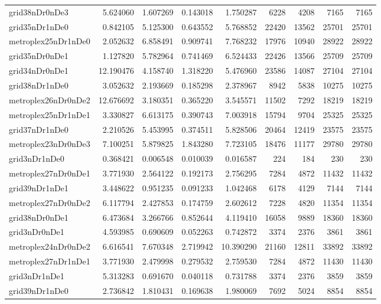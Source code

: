 \begin{longtable}{|l|r|r|r|r|r|r|r|r|}
grid38nDr0nDe3 & 5.624060 & 1.607269 & 0.143018 & 1.750287 & 6228 & 4208 & 7165 & 7165 \\
grid35nDr1nDe0 & 0.842105 & 5.125300 & 0.643552 & 5.768852 & 22420 & 13562 & 25701 & 25701 \\
metroplex25nDr1nDe0 & 2.052632 & 6.858491 & 0.909741 & 7.768232 & 17976 & 10940 & 28922 & 28922 \\
grid35nDr0nDe1 & 1.127820 & 5.782964 & 0.741469 & 6.524433 & 22426 & 13566 & 25709 & 25709 \\
grid34nDr0nDe1 & 12.190476 & 4.158740 & 1.318220 & 5.476960 & 23586 & 14087 & 27104 & 27104 \\
grid38nDr1nDe0 & 3.052632 & 2.193669 & 0.185298 & 2.378967 & 8942 & 5838 & 10275 & 10275 \\
metroplex26nDr0nDe2 & 12.676692 & 3.180351 & 0.365220 & 3.545571 & 11502 & 7292 & 18219 & 18219 \\
metroplex25nDr1nDe1 & 3.330827 & 6.613175 & 0.390743 & 7.003918 & 15794 & 9704 & 25325 & 25325 \\
grid37nDr1nDe0 & 2.210526 & 5.453995 & 0.374511 & 5.828506 & 20464 & 12419 & 23575 & 23575 \\
metroplex23nDr0nDe3 & 7.100251 & 5.879825 & 1.843280 & 7.723105 & 18476 & 11177 & 29780 & 29780 \\
grid3nDr1nDe0 & 0.368421 & 0.006548 & 0.010039 & 0.016587 & 224 & 184 & 230 & 230 \\
metroplex27nDr0nDe1 & 3.771930 & 2.564122 & 0.192173 & 2.756295 & 7284 & 4872 & 11432 & 11432 \\
grid39nDr1nDe1 & 3.448622 & 0.951235 & 0.091233 & 1.042468 & 6178 & 4129 & 7144 & 7144 \\
metroplex27nDr0nDe2 & 6.117794 & 2.427853 & 0.174759 & 2.602612 & 7228 & 4820 & 11354 & 11354 \\
grid38nDr0nDe1 & 6.473684 & 3.266766 & 0.852644 & 4.119410 & 16058 & 9889 & 18360 & 18360 \\
grid3nDr0nDe1 & 4.593985 & 0.690609 & 0.052263 & 0.742872 & 3374 & 2376 & 3861 & 3861 \\
metroplex24nDr0nDe2 & 6.616541 & 7.670348 & 2.719942 & 10.390290 & 21160 & 12811 & 33892 & 33892 \\
metroplex27nDr1nDe1 & 3.771930 & 2.479998 & 0.279532 & 2.759530 & 7284 & 4872 & 11430 & 11430 \\
grid3nDr1nDe1 & 5.313283 & 0.691670 & 0.040118 & 0.731788 & 3374 & 2376 & 3859 & 3859 \\
grid39nDr1nDe0 & 2.736842 & 1.810431 & 0.169638 & 1.980069 & 7692 & 5024 & 8854 & 8854 \\

\end{longtable}
